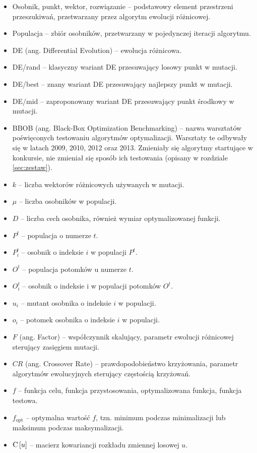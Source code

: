 \documentclass[a4paper,onecolumn,oneside,12pt,wide,floatssmall]{mwrep}
\def\C{{\rm C}\,}
\theoremstyle{definition}
\theoremstyle{plain}%
\theoremstyle{remark}
\begin{document}
\begin{itemize}
 \item[] Osobnik, punkt, wektor, rozwiązanie -- podstawowy element przestrzeni przeszukiwań, 
przetwarzany przez algorytm ewolucji różnicowej.
 \item[] Populacja -- zbiór osobników, przetwarzany w pojedynczej iteracji algorytmu.
 \item[] DE (ang. Differential Evolution) -- ewolucja różnicowa.
 \item[] DE/rand -- klasyczny wariant DE przesuwający losowy punkt w mutacji.
 \item[] DE/best -- znany wariant DE przesuwający najlepszy punkt w mutacji.
 \item[] DE/mid -- zaproponowany wariant DE przesuwający punkt środkowy w mutacji.
 \item[] BBOB (ang. Black-Box Optimization Benchmarking) -- nazwa warsztatów poświęconych testowaniu algorytmów optymalizacji. 
Warsztaty te odbywały się w latach 2009, 2010, 2012 oraz 2013. Zmieniały się algorytmy startujące w konkursie, nie zmieniał
się sposób ich testowania (opisany w rozdziale \ref{sec:zestaw}).
 \item[] $k$ -- liczba wektorów różnicowych używanych w mutacji.
 \item[] $\mu$ -- liczba osobników w populacji.
 \item[] $D$ -- liczba cech osobnika, również wymiar optymalizowanej funkcji.
 \item[] $P^t$ -- populacja o numerze $t$.
 \item[] $P_i^t$ -- osobnik o indeksie $i$ w populacji $P^t$.
 \item[] $O^t$ -- populacja potomków u numerze $t$.
 \item[] $O_i^t$ -- osobnik o indeksie i w populacji potomków $O^t$.
 \item[] $u_i$ -- mutant osobnika o indeksie $i$ w populacji.
 \item[] $o_i$ -- potomek osobnika o indeksie $i$ w populacji.
 \item[] $F$ (ang. Factor) -- współczynnik skalujący, parametr ewolucji różnicowej sterujący zasięgiem mutacji.
 \item[] $CR$ (ang. Crossover Rate) -- prawdopodobieństwo krzyżowania, parametr algorytmów ewolucyjnych sterujący częstością krzyżowań.
 \item[] $f$ -- funkcja celu, funkcja przystosowania, optymalizowana funkcja, funkcja testowa.
 \item[] $f_\text{opt}$ -- optymalna wartość $f$, tzn. minimum podczas minimalizacji lub maksimum podczas maksymalizacji.
 \item[] $\C[u]$ -- macierz kowariancji rozkładu zmiennej losowej $u$.
\end{itemize}
\end{document}

